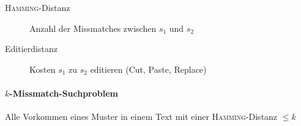 \begin{description}
  \item[\textsc{Hamming}-Distanz] Anzahl der Missmatches zwischen $s_1$ und $s_2$

  \item[Editierdistanz] Kosten $s_1$ zu $s_2$ editieren (Cut, Paste, Replace)
\end{description}

\paragraph{$k$-Missmatch-Suchproblem}

Alle Vorkommen eines Muster in einem Text mit einer \textsc{Hamming}-Distanz $\leq k$